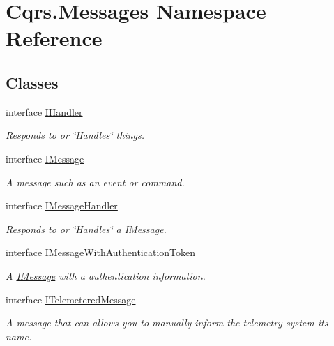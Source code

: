 \hypertarget{namespaceCqrs_1_1Messages}{}\section{Cqrs.\+Messages Namespace Reference}
\label{namespaceCqrs_1_1Messages}
\subsection*{Classes}
\begin{DoxyCompactItemize}
\item 
interface \hyperlink{interfaceCqrs_1_1Messages_1_1IHandler}{I\+Handler}
\begin{DoxyCompactList}\small\item\em Responds to or \char`\"{}\+Handles\char`\"{} things. \end{DoxyCompactList}\item 
interface \hyperlink{interfaceCqrs_1_1Messages_1_1IMessage}{I\+Message}
\begin{DoxyCompactList}\small\item\em A message such as an event or command. \end{DoxyCompactList}\item 
interface \hyperlink{interfaceCqrs_1_1Messages_1_1IMessageHandler}{I\+Message\+Handler}
\begin{DoxyCompactList}\small\item\em Responds to or \char`\"{}\+Handles\char`\"{} a \hyperlink{interfaceCqrs_1_1Messages_1_1IMessage}{I\+Message}. \end{DoxyCompactList}\item 
interface \hyperlink{interfaceCqrs_1_1Messages_1_1IMessageWithAuthenticationToken}{I\+Message\+With\+Authentication\+Token}
\begin{DoxyCompactList}\small\item\em A \hyperlink{interfaceCqrs_1_1Messages_1_1IMessage}{I\+Message} with a authentication information. \end{DoxyCompactList}\item 
interface \hyperlink{interfaceCqrs_1_1Messages_1_1ITelemeteredMessage}{I\+Telemetered\+Message}
\begin{DoxyCompactList}\small\item\em A message that can allows you to manually inform the telemetry system it\textquotesingle{}s name. \end{DoxyCompactList}\end{DoxyCompactItemize}
